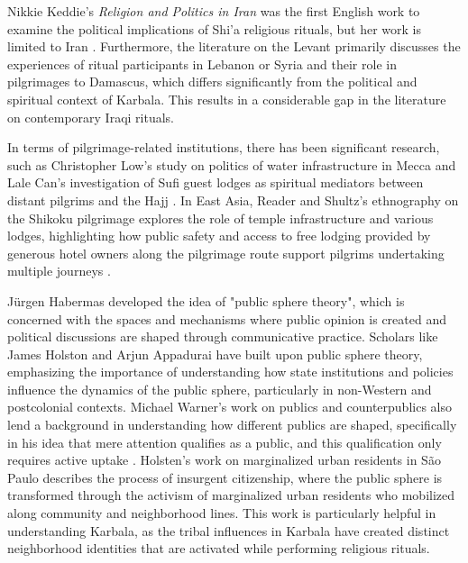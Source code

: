 Nikkie Keddie's \emph{Religion and Politics in Iran} was the first English work to examine the political implications of Shi'a religious rituals, but her work is limited to Iran \cite{keddie_religion_1983}. Furthermore, the literature on the Levant primarily discusses the experiences of ritual participants in Lebanon or Syria and their role in pilgrimages to Damascus, which differs significantly from the political and spiritual context of Karbala. This results in a considerable gap in the literature on contemporary Iraqi rituals.

In terms of pilgrimage-related institutions, there has been significant research, such as Christopher Low's study on politics of water infrastructure in Mecca \cite{low_imperial_2020} and Lale Can's investigation of Sufi guest lodges as spiritual mediators between distant pilgrims and the Hajj \cite{can_spiritual_2020}. In East Asia, Reader and Shultz's ethnography on the Shikoku pilgrimage explores the role of temple infrastructure and various lodges, highlighting how public safety and access to free lodging provided by generous hotel owners along the pilgrimage route support pilgrims undertaking multiple journeys \cite{reader_pilgrims_2021}.

Jürgen Habermas developed the idea of "public sphere theory", which is concerned with the spaces and mechanisms where public opinion is created and political discussions are shaped through communicative practice\cite{habermas_structural_1999}. Scholars like James Holston \cite{holston_insurgent_2008} and Arjun Appadurai \cite{appadurai_fear_2006} have built upon public sphere theory, emphasizing the importance of understanding how state institutions and policies influence the dynamics of the public sphere, particularly in non-Western and postcolonial contexts. Michael Warner's work on publics and counterpublics also lend a background in understanding how different publics are shaped, specifically in his idea that mere attention qualifies as a public, and this qualification only requires active uptake \cite[87]{warner_publics_2010}. Holsten's work on marginalized urban residents in São Paulo describes the process of insurgent citizenship, where the public sphere is transformed through the activism of marginalized urban residents who mobilized along community and neighborhood lines. This work is particularly helpful in understanding Karbala, as the tribal influences in Karbala have created distinct neighborhood identities that are activated while performing religious rituals.

